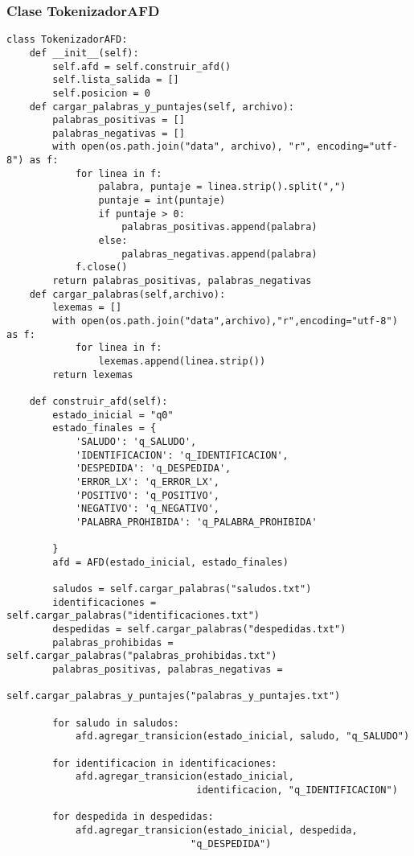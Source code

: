 \documentclass[12pt,a4paper]{article}
\begin{document}
\subsubsection{Clase TokenizadorAFD}
\begin{verbatim}
class TokenizadorAFD:
    def __init__(self):
        self.afd = self.construir_afd()
        self.lista_salida = []
        self.posicion = 0
    def cargar_palabras_y_puntajes(self, archivo):
        palabras_positivas = []
        palabras_negativas = []
        with open(os.path.join("data", archivo), "r", encoding="utf-8") as f:
            for linea in f:
                palabra, puntaje = linea.strip().split(",")
                puntaje = int(puntaje)
                if puntaje > 0:
                    palabras_positivas.append(palabra)
                else:
                    palabras_negativas.append(palabra)
            f.close()
        return palabras_positivas, palabras_negativas
    def cargar_palabras(self,archivo):
        lexemas = []
        with open(os.path.join("data",archivo),"r",encoding="utf-8") as f:
            for linea in f:
                lexemas.append(linea.strip())
        return lexemas

    def construir_afd(self):
        estado_inicial = "q0"
        estado_finales = {
            'SALUDO': 'q_SALUDO',
            'IDENTIFICACION': 'q_IDENTIFICACION',
            'DESPEDIDA': 'q_DESPEDIDA',
            'ERROR_LX': 'q_ERROR_LX',
            'POSITIVO': 'q_POSITIVO',
            'NEGATIVO': 'q_NEGATIVO',
            'PALABRA_PROHIBIDA': 'q_PALABRA_PROHIBIDA' 

        }     
        afd = AFD(estado_inicial, estado_finales)
        
        saludos = self.cargar_palabras("saludos.txt")
        identificaciones = self.cargar_palabras("identificaciones.txt")
        despedidas = self.cargar_palabras("despedidas.txt")
        palabras_prohibidas = self.cargar_palabras("palabras_prohibidas.txt")
        palabras_positivas, palabras_negativas = 
                    self.cargar_palabras_y_puntajes("palabras_y_puntajes.txt")

        for saludo in saludos:
            afd.agregar_transicion(estado_inicial, saludo, "q_SALUDO")

        for identificacion in identificaciones:
            afd.agregar_transicion(estado_inicial,
                                 identificacion, "q_IDENTIFICACION")

        for despedida in despedidas:
            afd.agregar_transicion(estado_inicial, despedida, 
                                "q_DESPEDIDA")


\end{verbatim}
\end{document}
